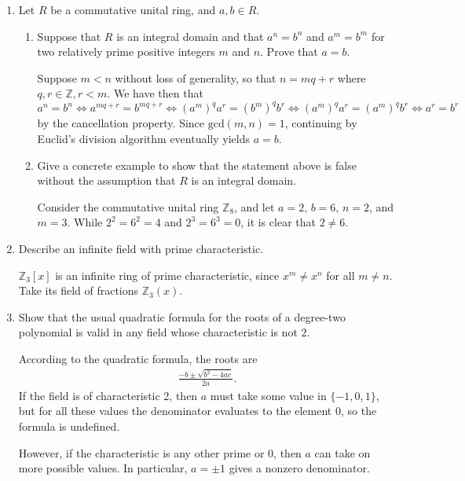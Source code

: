 \documentclass[12pt]{article}
\begin{document}
\begin{enumerate}
    \item Let $R$ be a commutative unital ring, and $a,b\in R$.
    \begin{enumerate}
        \item Suppose that $R$ is an integral domain and that $a^n = b^n$ and $a^m = b^m$ for two relatively prime positive integers $m$ and $n$.  Prove that $a = b$. \par
            Suppose $m < n$ without loss of generality, so that $n = mq + r$ where $q, r \in \mathbb{Z}, r < m$. We have then that $a^n = b^n \Leftrightarrow a^{mq + r} = b^{mq + r} \Leftrightarrow \left( a^m \right)^q a^r = \left( b^m \right)^q b^r \Leftrightarrow \left( a^m \right)^q a^r = \left( a^m \right)^q b^r \Leftrightarrow a^r = b^r$ by the cancellation property. Since $\text{gcd}(m, n) = 1$, continuing by Euclid's division algorithm eventually yields $a = b$.

        \item Give a concrete example to show that the statement above is false  without the assumption that $R$ is an integral domain. \par
            Consider the commutative unital ring $\mathbb{Z}_8$, and let $a = 2$, $b = 6$, $n = 2$, and $m = 3$. While $2^2 = 6^2 = 4$ and $2^3 = 6^3 = 0$, it is clear that $2 \neq 6$.
    \end{enumerate}

    \item Describe an infinite field with prime characteristic. \par
        $\mathbb{Z}_3[x]$ is an infinite ring of prime characteristic, since $x^m \neq x^n$ for all $m \neq n$. Take its field of fractions $\mathbb{Z}_3(x)$.

    \item Show that the usual quadratic formula for the roots of a degree-two polynomial is valid in any field whose characteristic is not $2$. \par
        According to the quadratic formula, the roots are
        \begin{align*}
            \frac{-b \pm \sqrt{b^2 - 4ac}}{2a}.
        \end{align*}
        If the field is of characteristic 2, then $a$ must take some value in $\{ -1, 0, 1 \}$, but for all these values the denominator evaluates to the element $0$, so the formula is undefined. \par
        However, if the characteristic is any other prime or 0, then $a$ can take on more possible values. In particular, $a = \pm 1$ gives a nonzero denominator.


\end{enumerate}
\end{document}
